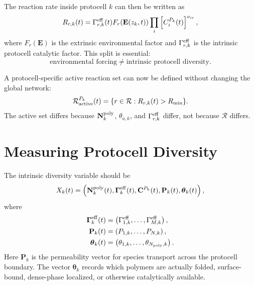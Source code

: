 \documentclass[11pt]{article}
\begin{document}
The reaction rate inside protocell $k$ can then be written as
\begin{equation}
R_{r,k}(t)
=
\Gamma^{\rm eff}_{r,k}(t)
F_r\!\left(\mathbf{E}(z_k,t)\right)
\prod_i
\left[
C^{P_k}_i(t)
\right]^{\nu_{ir}},
\end{equation}
where $F_r(\mathbf{E})$ is the extrinsic environmental factor and $\Gamma^{\rm eff}_{r,k}$ is the intrinsic protocell catalytic factor. This split is essential:
\begin{equation}
\text{environmental forcing}
\neq
\text{intrinsic protocell diversity}.
\end{equation}

A protocell-specific active reaction set can now be defined without changing the global network:
\begin{equation}
\mathcal{R}^{P_k}_{\rm active}(t)
=
\{r\in\mathcal{R}: R_{r,k}(t)>R_{\rm min}\}.
\end{equation}
The active set differs because $\mathbf{N}^{\rm poly}_k$, $\theta_{a,k}$, and $\Gamma^{\rm eff}_{r,k}$ differ, not because $\mathcal{R}$ differs.

\section{Measuring Protocell Diversity}

The intrinsic diversity variable should be
\begin{equation}
X_k(t)
=
\left(
\mathbf{N}^{\rm poly}_k(t),
\boldsymbol{\Gamma}^{\rm eff}_k(t),
\mathbf{C}^{P_k}(t),
\mathbf{P}_k(t),
\boldsymbol{\theta}_k(t)
\right),
\end{equation}
where
\begin{align}
\boldsymbol{\Gamma}^{\rm eff}_k(t)
&=
\left(\Gamma^{\rm eff}_{1,k},\ldots,\Gamma^{\rm eff}_{M,k}\right),\\
\mathbf{P}_k(t)
&=
\left(P_{1,k},\ldots,P_{N,k}\right),\\
\boldsymbol{\theta}_k(t)
&=
\left(\theta_{1,k},\ldots,\theta_{N_{\rm poly},k}\right).
\end{align}
Here $\mathbf{P}_k$ is the permeability vector for species transport across the protocell boundary. The vector $\boldsymbol{\theta}_k$ records which polymers are actually folded, surface-bound, dense-phase localized, or otherwise catalytically available.
\end{document}
